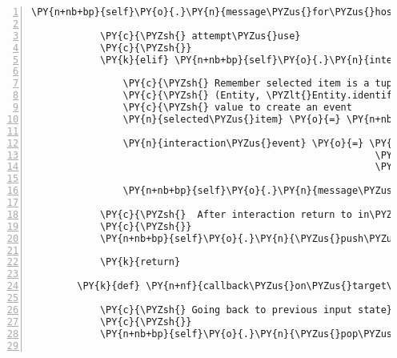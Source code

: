 \begin{Verbatim}[commandchars=\\\{\},numbers=left,firstnumber=1,stepnumber=1]
                \PY{n+nb+bp}{self}\PY{o}{.}\PY{n}{message\PYZus{}for\PYZus{}host}\PY{o}{.}\PY{n}{event\PYZus{}list}\PY{o}{.}\PY{n}{append}\PY{p}{(}\PY{n}{interaction\PYZus{}event}\PY{p}{)}

            \PY{c}{\PYZsh{} attempt\PYZus{}use}
            \PY{c}{\PYZsh{}}
            \PY{k}{elif} \PY{n+nb+bp}{self}\PY{o}{.}\PY{n}{interaction\PYZus{}sound\PYZus{}menu}\PY{o}{.}\PY{n}{list\PYZus{}index} \PY{o}{==} \PY{n+nb+bp}{self}\PY{o}{.}\PY{n}{ATTEMPT\PYZus{}USE}\PY{p}{:}

                \PY{c}{\PYZsh{} Remember selected item is a tuple of}
                \PY{c}{\PYZsh{} (Entity, \PYZlt{}Entity.identifier|location\PYZgt{}) and we need the second}
                \PY{c}{\PYZsh{} value to create an event                \PYZsh{}}
                \PY{n}{selected\PYZus{}item} \PY{o}{=} \PY{n+nb+bp}{self}\PY{o}{.}\PY{n}{select\PYZus{}item\PYZus{}menu}\PY{o}{.}\PY{n}{list}\PY{p}{[}\PY{n+nb+bp}{self}\PY{o}{.}\PY{n}{select\PYZus{}item\PYZus{}menu}\PY{o}{.}\PY{n}{list\PYZus{}index}\PY{p}{]}\PY{p}{[}\PY{l+m+mi}{1}\PY{p}{]}

                \PY{n}{interaction\PYZus{}event} \PY{o}{=} \PY{n}{fabula}\PY{o}{.}\PY{n}{TriesToDropEvent}\PY{p}{(}\PY{n+nb+bp}{self}\PY{o}{.}\PY{n}{host}\PY{o}{.}\PY{n}{client\PYZus{}id}\PY{p}{,}
                                                            \PY{n}{selected\PYZus{}item}\PY{p}{,}
                                                            \PY{n}{selected\PYZus{}target}\PY{p}{)}

                \PY{n+nb+bp}{self}\PY{o}{.}\PY{n}{message\PYZus{}for\PYZus{}host}\PY{o}{.}\PY{n}{event\PYZus{}list}\PY{o}{.}\PY{n}{append}\PY{p}{(}\PY{n}{interaction\PYZus{}event}\PY{p}{)}

            \PY{c}{\PYZsh{}  After interaction return to in\PYZhy{}room\PYZhy{}input\PYZhy{}state}
            \PY{c}{\PYZsh{}}
            \PY{n+nb+bp}{self}\PY{o}{.}\PY{n}{\PYZus{}push\PYZus{}input\PYZus{}state\PYZus{}on\PYZus{}stack}\PY{p}{(}\PY{n+nb+bp}{self}\PY{o}{.}\PY{n}{INPUT\PYZus{}STATE\PYZus{}IN\PYZus{}ROOM}\PY{p}{)}

            \PY{k}{return}

        \PY{k}{def} \PY{n+nf}{callback\PYZus{}on\PYZus{}target\PYZus{}menu\PYZus{}exit}\PY{p}{(}\PY{n}{select\PYZus{}target\PYZus{}menu}\PY{p}{)}\PY{p}{:}

            \PY{c}{\PYZsh{} Going back to previous input state}
            \PY{c}{\PYZsh{}}
            \PY{n+nb+bp}{self}\PY{o}{.}\PY{n}{\PYZus{}pop\PYZus{}input\PYZus{}state\PYZus{}from\PYZus{}stack}\PY{p}{(}\PY{p}{)}


\end{Verbatim}
